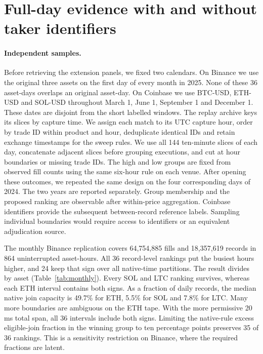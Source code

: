 \section{Full-day evidence with and without taker identifiers}

\paragraph{Independent samples.}
Before retrieving the extension panels, we fixed two calendars. On Binance we use the original three assets on the first day of every month in 2025. None of these 36 asset-days overlaps an original asset-day. On Coinbase we use BTC-USD, ETH-USD and SOL-USD throughout March 1, June 1, September 1 and December 1. These dates are disjoint from the short labelled windows. The replay archive keys its slices by capture time. We assign each match to its UTC capture hour, order by trade ID within product and hour, deduplicate identical IDs and retain exchange timestamps for the sweep rules. We use all 144 ten-minute slices of each day, concatenate adjacent slices before grouping executions, and cut at hour boundaries or missing trade IDs. The high and low groups are fixed from observed fill counts using the same six-hour rule on each venue. After opening these outcomes, we repeated the same design on the four corresponding days of 2024. The two years are reported separately. Group membership and the proposed ranking are observable after within-price aggregation. Coinbase identifiers provide the subsequent between-record reference labels. Sampling individual boundaries would require access to identifiers or an equivalent adjudication source.

The monthly Binance replication covers 64,754,885 fills and 18,357,619 records in 864 uninterrupted asset-hours. All 36 record-level rankings put the busiest hours higher, and 24 keep that sign over all native-time partitions. The result divides by asset (Table~\ref{tab:monthly}). Every SOL and LTC ranking survives, whereas each ETH interval contains both signs. As a fraction of daily records, the median native join capacity is 49.7\% for ETH, 5.5\% for SOL and 7.8\% for LTC. Many more boundaries are ambiguous on the ETH tape. With the more permissive 20 ms total span, all 36 intervals include both signs. Limiting the native-rule excess eligible-join fraction in the winning group to ten percentage points preserves 35 of 36 rankings. This is a sensitivity restriction on Binance, where the required fractions are latent.

